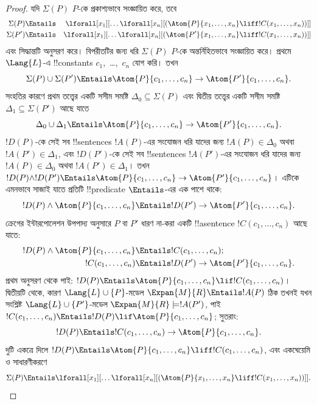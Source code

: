 \documentclass[../../../include/open-logic-section]{subfiles}
\begin{document}
\begin{proof}
যদি $\Sigma(P)$ $P$-কে প্রকাশ্যভাবে সংজ্ঞায়িত করে, তবে
\begin{align*}
  \Sigma(P) & \Entails & \lforall[x_1][\dots \lforall[x_n]
    [(\Atom{P}{x_1,\dots, x_n} \liff !C(x_1,\dots,x_n))]]\\
  \Sigma(P') & \Entails & \lforall[x_1][\dots \lforall[x_n]
    [(\Atom{P'}{x_1,\dots, x_n} \liff !C(x_1,\dots,x_n))]]
\end{align*}
এবং সিদ্ধান্তটি অনুসরণ করে। বিপরীতটির জন্য ধরি $\Sigma(P)$
$P$-কে অন্তর্নিহিতভাবে সংজ্ঞায়িত করে। প্রথমে $\Lang{L}$-এ
!!{constant}s $c_1$, \,\dots,~$c_n$ যোগ করি। তখন
\[
\Sigma(P) \cup \Sigma(P') \Entails
\Atom{P}{c_1, \dots, c_n} \to  \Atom{P'}{c_1, \dots, c_n}.
\]
সংহতির কারণে প্রথম তত্ত্বের একটি সসীম সমষ্টি
$\Delta_0 \subseteq \Sigma(P)$ এবং দ্বিতীয় তত্ত্বের একটি সসীম
সমষ্টি $\Delta_1 \subseteq \Sigma(P')$ আছে যাতে
\[
\Delta_0 \cup \Delta_1 \Entails
\Atom{P}{c_1, \dots, c_n} \to \Atom{P'}{c_1, \dots, c_n}.
\]
$!D(P)$-কে সেই সব !!{sentence}s $!A(P)$-এর সংযোজন ধরি যাদের
জন্য $!A(P) \in \Delta_0$ অথবা $!A(P') \in \Delta_1$, এবং
$!D(P')$-কে সেই সব !!{sentence}s $!A(P')$-এর সংযোজন ধরি যাদের
জন্য $!A(P) \in \Delta_0$ অথবা $!A(P') \in \Delta_1$। তখন
$!D(P) \land !D(P') \Entails \Atom{P}{c_1, \dots, c_n} \to
\Atom{P'}{c_1, \dots, c_n}$। এটিকে এমনভাবে সাজাই যাতে প্রতিটি
!!{predicate} $\Entails$-এর এক পাশে থাকে:
\[
!D(P) \land \Atom{P}{c_1, \dots, c_n} \Entails
!D(P') \to \Atom{P'}{c_1, \dots, c_n}.
\]
ক্রেগের ইন্টারপোলেশন উপপাদ্য অনুসারে $P$ বা $P'$ ধারণ না-করা
একটি !!a{sentence} $!C(c_1,\dots, c_n)$ আছে যাতে:
\begin{align*}
  !D(P) \land \Atom{P}{c_1, \dots, c_n} & \Entails !C(c_1,\dots, c_n); \\
  !C(c_1,\dots, c_n) & \Entails !D(P') \to \Atom{P'}{c_1, \dots, c_n}.
\end{align*}
প্রথম অনুসরণ থেকে পাই:
$!D(P) \Entails \Atom{P}{c_1,\dots, c_n} \lif !C(c_1,\dots, c_n)$।
দ্বিতীয়টি থেকে, কারণ $\Lang{L} \cup \{P\}$-মডেল
$\Expan{M}{R} \Entails !A(P)$ ঠিক তখনই যখন সংশ্লিষ্ট
$\Lang{L} \cup \{P'\}$-মডেল $\Expan{M}{R} \models !A(P')$,
পাই $!C(c_1,\dots, c_n) \Entails !D(P) \lif
\Atom{P}{c_1,\dots, c_n}$; সুতরাং:
\[
!D(P) \Entails !C(c_1,\dots,c_n) \to \Atom{P}{c_1,\dots, c_n}.
\]
দুটি একত্রে দিলে
$!D(P) \Entails \Atom{P}{c_1,\dots,c_n} \liff !C(c_1, \dots, c_n)$,
এবং একঘেয়েমি ও সাধারণীকরণে
\[
\Sigma(P) \Entails
\lforall[x_1][\dots\lforall[x_n][(\Atom{P}{x_1,\dots, x_n} \liff
    !C(x_1,\dots, x_n))]].
\]
\end{proof}
\end{document}

